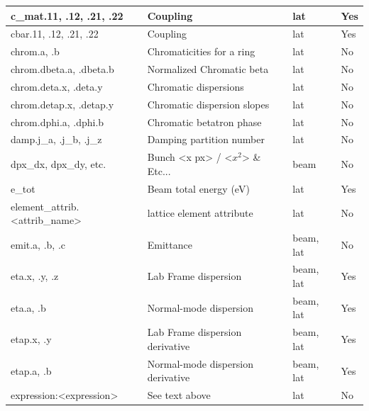 {\begin{longtable}{llll}
  c_mat.11, .12, .21, .22             & Coupling                                      & lat         & Yes \\ \hline 
  cbar.11, .12, .21, .22              & Coupling                                      & lat         & Yes \\ \hline 
  chrom.a, .b                         & Chromaticities for a ring                     & lat         & No  \\ \hline
  chrom.dbeta.a, .dbeta.b             & Normalized Chromatic beta                     & lat         & No  \\ \hline
  chrom.deta.x, .deta.y               & Chromatic dispersions                         & lat         & No  \\ \hline
  chrom.detap.x, .detap.y             & Chromatic dispersion slopes                   & lat       & No  \\ \hline
  chrom.dphi.a, .dphi.b               & Chromatic betatron phase                      & lat       & No  \\ \hline

  damp.j_a, .j_b, .j_z                & Damping partition number                      & lat         & No  \\ \hline
  dpx_dx, dpx_dy, etc.                & Bunch <x px> / <$x^2$> \& Etc...              & beam        & No  \\ \hline 

  e_tot                               & Beam total energy (eV)                        & lat         & Yes \\ \hline
  element_attrib.<attrib_name>        & lattice element attribute                     & lat         & No  \\ \hline
  emit.a, .b, .c                      & Emittance                                     & beam, lat   & No  \\ \hline
  eta.x, .y, .z                       & Lab Frame dispersion                          & beam, lat   & Yes \\ \hline 
  eta.a, .b                           & Normal-mode dispersion                        & beam, lat   & Yes \\ \hline 
  etap.x, .y                          & Lab Frame dispersion derivative               & beam, lat   & Yes \\ \hline 
  etap.a, .b                          & Normal-mode dispersion derivative             & beam, lat   & Yes \\ \hline 
  expression:<expression>             & See text above                                & lat         & No  \\ \hline 


\end{longtable}}
